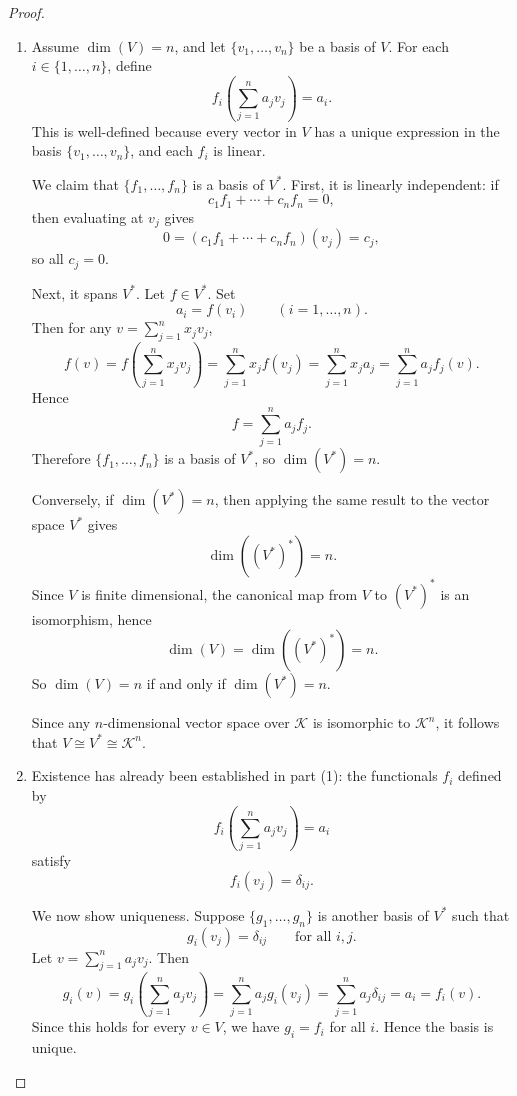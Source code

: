 \documentclass{ctexart}
\begin{document}
    \begin{proof}
    \leavevmode
    \begin{enumerate}
        \item Assume $\dim(V)=n$, and let $\{v_1,\dots,v_n\}$ be a basis of $V$. For each $i\in\{1,\dots,n\}$, define
        \[
        f_i\!\left(\sum_{j=1}^n a_jv_j\right)=a_i.
        \]
        This is well-defined because every vector in $V$ has a unique expression in the basis $\{v_1,\dots,v_n\}$, and each $f_i$ is linear.

        We claim that $\{f_1,\dots,f_n\}$ is a basis of $V^*$. First, it is linearly independent: if
        \[
        c_1f_1+\cdots+c_nf_n=0,
        \]
        then evaluating at $v_j$ gives
        \[
        0=(c_1f_1+\cdots+c_nf_n)(v_j)=c_j,
        \]
        so all $c_j=0$.

        Next, it spans $V^*$. Let $f\in V^*$. Set
        \[
        a_i=f(v_i)\qquad (i=1,\dots,n).
        \]
        Then for any $v=\sum_{j=1}^n x_jv_j$,
        \[
        f(v)
        =
        f\!\left(\sum_{j=1}^n x_jv_j\right)
        =
        \sum_{j=1}^n x_jf(v_j)
        =
        \sum_{j=1}^n x_ja_j
        =
        \sum_{j=1}^n a_jf_j(v).
        \]
        Hence
        \[
        f=\sum_{j=1}^n a_jf_j.
        \]
        Therefore $\{f_1,\dots,f_n\}$ is a basis of $V^*$, so $\dim(V^*)=n$.

        Conversely, if $\dim(V^*)=n$, then applying the same result to the vector space $V^*$ gives
        \[
        \dim((V^*)^*)=n.
        \]
        Since $V$ is finite dimensional, the canonical map from $V$ to $(V^*)^*$ is an isomorphism, hence
        \[
        \dim(V)=\dim((V^*)^*)=n.
        \]
        So $\dim(V)=n$ if and only if $\dim(V^*)=n$.

        Since any $n$-dimensional vector space over $\mathcal{K}$ is isomorphic to $\mathcal{K}^n$, it follows that $V\cong V^*\cong \mathcal{K}^n$.

        \item Existence has already been established in part (1): the functionals $f_i$ defined by
        \[
        f_i\!\left(\sum_{j=1}^n a_jv_j\right)=a_i
        \]
        satisfy
        \[
        f_i(v_j)=\delta_{ij}.
        \]

        We now show uniqueness. Suppose $\{g_1,\dots,g_n\}$ is another basis of $V^*$ such that
        \[
        g_i(v_j)=\delta_{ij}
        \qquad
        \text{for all } i,j.
        \]
        Let $v=\displaystyle \sum_{j=1}^n a_jv_j$. Then
        \[
        g_i(v)
        =
        g_i\!\left(\sum_{j=1}^n a_jv_j\right)
        =
        \sum_{j=1}^n a_jg_i(v_j)
        =
        \sum_{j=1}^n a_j\delta_{ij}
        =
        a_i
        =
        f_i(v).
        \]
        Since this holds for every $v\in V$, we have $g_i=f_i$ for all $i$. Hence the basis is unique.


\end{enumerate}
\end{proof}
\end{document}

